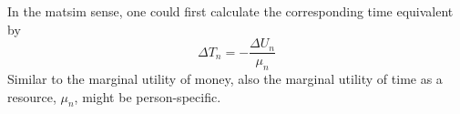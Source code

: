 In the \acrshort{matsim} sense, one could first calculate the corresponding time equivalent 
%
by
%
\begin{equation}
\label{eq:ch:economicEval:monetizationTime}
\Delta T_n =  - \frac{\Delta U_n}{\mu_n}
\end{equation}
%
Similar to the marginal utility of money, also the marginal utility of time as a resource, $\mu_n$, might be person-specific.
%

